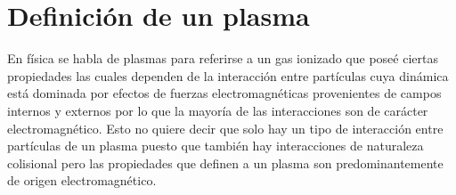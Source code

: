 \documentclass[../tesis_main_file.tex]{subfiles}
\begin{document}
\section{Definición de un plasma}
En física se habla de plasmas para referirse a un gas ionizado que poseé ciertas propiedades las cuales dependen de la interacción entre partículas cuya dinámica está dominada por efectos de fuerzas electromagnéticas provenientes de campos internos y externos por lo que la mayoría de las interacciones son de carácter electromagnético.
Esto no quiere decir que solo hay un tipo de interacción entre partículas de un plasma puesto que también hay interacciones de naturaleza colisional pero las propiedades que definen a un plasma son predominantemente de origen electromagnético. 
\end{document}
